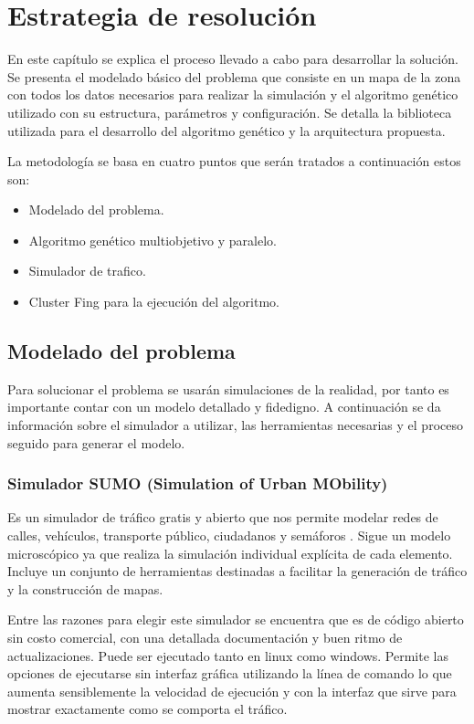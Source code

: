 \chapter{Estrategia de resolución}

En este capítulo se explica el proceso llevado a cabo para desarrollar la solución. Se presenta el modelado básico del problema que consiste en un mapa de la zona con todos los datos necesarios para realizar la simulación y el algoritmo genético utilizado con su estructura, parámetros y configuración. Se detalla la biblioteca utilizada para el desarrollo del algoritmo genético y la arquitectura propuesta.

La metodología se basa en cuatro puntos que serán tratados a continuación estos son:

\begin{itemize}
	\item Modelado del problema.
	\item Algoritmo genético multiobjetivo y paralelo.
	\item Simulador de trafico.
	\item Cluster Fing para la ejecución del algoritmo. 
\end{itemize}





\section{Modelado del problema }

Para solucionar el problema se usarán simulaciones de la realidad, por tanto es importante contar con un modelo detallado y fidedigno. A continuación se da información sobre el simulador a utilizar, las herramientas necesarias y el proceso seguido para generar el modelo. 

\subsection{Simulador SUMO (Simulation of Urban MObility)}

Es un simulador de tráfico gratis y abierto que nos permite modelar redes de calles, vehículos, transporte público, ciudadanos y semáforos \citep{SUMO}. Sigue un modelo microscópico ya que realiza la simulación individual explícita de cada elemento. Incluye un conjunto de herramientas destinadas  a facilitar la generación de tráfico y la construcción de mapas. 

Entre las razones para elegir este simulador se encuentra que es de código abierto sin costo comercial, con una detallada documentación y buen ritmo de actualizaciones. Puede ser ejecutado tanto en linux como windows. Permite las opciones de ejecutarse sin interfaz gráfica utilizando la línea de comando lo que aumenta sensiblemente la velocidad de ejecución y con la interfaz que sirve para mostrar exactamente como se comporta el tráfico.


